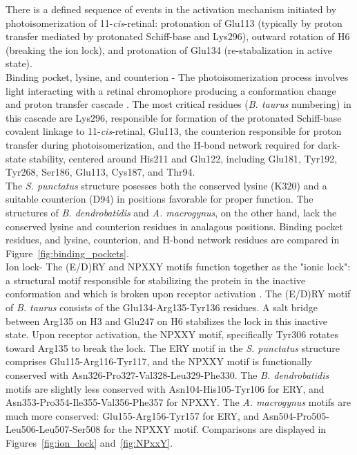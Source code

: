 \indent There is a defined sequence of events in the activation mechanism initiated by photoisomerization of 11-\textit{cis}-retinal: protonation of Glu113 (typically by proton transfer mediated by protonated Schiff-base and Lys296), outward rotation of H6 (breaking the ion lock), and protonation of Glu134 (re-stabalization in active state).\\
\indent Binding pocket, lysine, and counterion - The photoisomerization process involves light interacting with a retinal chromophore producing a conformation change and proton transfer cascade \cite{Birge1990,Smith2010}. The most critical residues (\textit{B. taurus} numbering) in this cascade are Lys296, responsible for formation of the protonated Schiff-base covalent linkage to 11-\textit{cis}-retinal, Glu113, the counterion responsible for proton transfer during photoisomerization, and the H-bond network required for dark-state stability, centered around His211 and Glu122, including Glu181, Tyr192, Tyr268, Ser186, Glu113, Cys187, and Thr94. \\
\indent The \textit{S. punctatus} structure posesses both the conserved lysine (K320) and a suitable counterion (D94) in positions favorable for proper function. The structures of \textit{B. dendrobatidis} and \textit{A. macrogynus}, on the other hand, lack the conserved lysine and counterion residues in analagous positions. Binding pocket residues, and lysine, counterion, and H-bond network residues are compared in Figure~\ref{fig:binding_pockets}.\\
\indent Ion lock- The (E/D)RY and NPXXY motifs function together as the "ionic lock": a structural motif responsible for stabilizing the protein in the inactive conformation and which is broken upon receptor activation \cite{Smith2010}. The (E/D)RY motif of \textit{B. taurus} consists of the Glu134-Arg135-Tyr136 residues. A salt bridge between Arg135 on H3 and Glu247 on H6 stabilizes the lock in this inactive state. Upon receptor activation, the NPXXY motif, specifically Tyr306 rotates toward Arg135 to break the lock. The ERY motif in the \textit{S. punctatus} structure comprises Glu115-Arg116-Tyr117, and the NPXXY motif is functionally conserved with Asn326-Pro327-Val328-Leu329-Phe330. The \textit{B. dendrobatidis} motifs are slightly less conserved with Asn104-His105-Tyr106 for ERY, and Asn353-Pro354-Ile355-Val356-Phe357 for NPXXY. The \textit{A. macrogynus} motifs are much more conserved: Glu155-Arg156-Tyr157 for ERY, and Asn504-Pro505-Leu506-Leu507-Ser508 for the NPXXY motif. Comparisons are displayed in Figures~\ref{fig:ion_lock} and~\ref{fig:NPxxY}. \\
